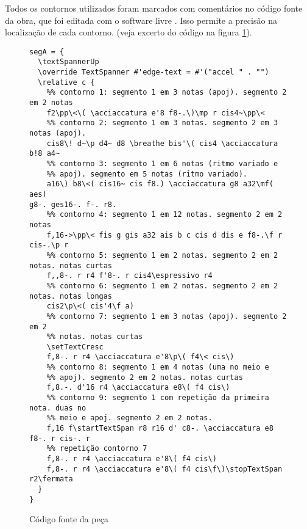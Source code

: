 \documentclass[12pt]{article}
\begin{document}
Todos os contornos utilizados foram marcados com comentários no código
fonte da obra, que foi editada com o software livre 
\cite{nienhuys.ea08:lilypond}. Isso permite a precisão na localização
de cada contorno. (veja excerto do código na figura \ref{fig:codigo}).

\begin{figure}[h]
  \centering
\begin{verbatim}
segA = {
  \textSpannerUp
  \override TextSpanner #'edge-text = #'("accel " . "")
  \relative c {
    %% contorno 1: segmento 1 em 3 notas (apoj). segmento 2 em 2 notas
    f2\pp\<\( \acciaccatura e'8 f8-.\)\mp r cis4~\pp\<
    %% contorno 2: segmento 1 em 3 notas. segmento 2 em 3 notas (apoj).
    cis8\! d~\p d4~ d8 \breathe bis'\( cis4 \acciaccatura b!8 a4~
    %% contorno 3: segmento 1 em 6 notas (ritmo variado e
    %% apoj). segmento em 5 notas (ritmo variado).
    a16\) b8\<( cis16~ cis f8.) \acciaccatura g8 a32\mf( aes)
g8-. ges16-. f-. r8.
    %% contorno 4: segmento 1 em 12 notas. segmento 2 em 2 notas
    f,16->\pp\< fis g gis a32 ais b c cis d dis e f8-.\f r cis-.\p r
    %% contorno 5: segmento 1 em 2 notas. segmento 2 em 2 notas. notas curtas
    f,,8-. r r4 f'8-. r cis4\espressivo r4
    %% contorno 6: segmento 1 em 2 notas. segmento 2 em 2 notas. notas longas
    cis2\p\<( cis'4\f a)
    %% contorno 7: segmento 1 em 3 notas (apoj). segmento 2 em 2
    %% notas. notas curtas
    \setTextCresc
    f,8-. r r4 \acciaccatura e'8\p\( f4\< cis\)
    %% contorno 8: segmento 1 em 4 notas (uma no meio e
    %% apoj). segmento 2 em 2 notas. notas curtas
    f,8.-. d'16 r4 \acciaccatura e8\( f4 cis\)
    %% contorno 9: segmento 1 com repetição da primeira nota. duas no
    %% meio e apoj. segmento 2 em 2 notas.
    f,16 f\startTextSpan r8 r16 d' c8-. \acciaccatura e8 f8-. r cis-. r
    %% repetição contorno 7
    f,8-. r r4 \acciaccatura e'8\( f4 cis\)
    f,8-. r r4 \acciaccatura e'8\( f4 cis\f\)\stopTextSpan r2\fermata
  }
}
\end{verbatim}
  \caption{Código fonte da peça}
  \label{fig:codigo}
\end{figure}



\end{document}
